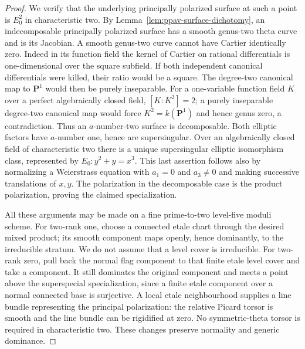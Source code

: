 \begin{proof}
We verify that the underlying principally polarized surface
at such a point is $E_0^2$ in characteristic two. By
Lemma~\ref{lem:ppav-surface-dichotomy}, an indecomposable
principally polarized surface has a smooth genus-two theta
curve and is its Jacobian. A smooth genus-two curve cannot
have Cartier identically zero. Indeed in its function field
the kernel of Cartier on rational differentials is
one-dimensional over the square subfield. If both independent
canonical differentials were killed, their ratio would be a
square. The degree-two canonical map to $\mathbf P^1$
would then be purely inseparable. For a one-variable
function field $K$ over a perfect algebraically closed
field, $[K:K^2]=2$; a purely inseparable degree-two
canonical map would force $K^2=k(\mathbf P^1)$ and hence
genus zero, a contradiction.
Thus an $a$-number-two surface is decomposable. Both
elliptic factors have $a$-number one, hence are supersingular.
Over an algebraically closed field of characteristic two
there is a unique supersingular elliptic isomorphism class,
represented by $E_0:y^2+y=x^3$. This last assertion follows
also by normalizing a Weierstrass equation with $a_1=0$
and $a_3\ne0$ and making successive translations of $x,y$.
The polarization in the decomposable case is the product
polarization, proving the claimed specialization.

All these arguments may be made on a fine prime-to-two
level-five moduli scheme. For two-rank one, choose a
connected etale chart through the desired mixed product;
its smooth component maps openly, hence dominantly, to
the irreducible stratum. We do not assume that a level
cover is irreducible. For two-rank zero, pull back the
normal flag component to that finite etale level cover
and take a component. It still dominates the original
component and meets a point above the superspecial
specialization, since a finite etale component over a
normal connected base is surjective. A local etale
neighbourhood supplies a line bundle representing the
principal polarization: the relative Picard torsor is
smooth and the line bundle can be rigidified at zero.
No symmetric-theta torsor is required in characteristic two.
These changes preserve normality and generic dominance.
\end{proof}

